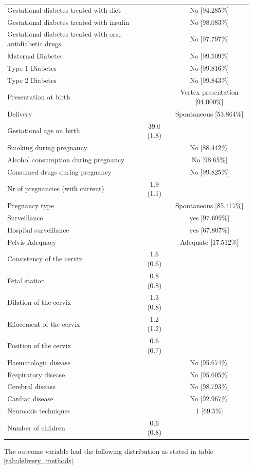 \begin{table}[htbp]
\begin{tabular}{m{15em}cc}
        Gestational diabetes treated with diet & ~ & No [94.285\%] \\ 
        Gestational diabetes treated with insulin & ~ & No [98.083\%] \\ 
        Gestational diabetes treated with oral antidiabetic drugs & ~ & No [97.797\%] \\ 
        Maternal Diabetes & ~ & No [99.509\%] \\ 
        Type 1 Diabetes & ~ & No [99.816\%] \\ 
        Type 2 Diabetes & ~ & No [99.843\%] \\ 
        Presentation at birth & ~ & Vertex presentation [94.000\%] \\ 
        Delivery & ~ & Spontaneous [53.864\%] \\ 
        Gestational age on birth & 39.0 (1.8) & ~ \\ 
        Smoking during pregnancy & ~ & No [88.442\%] \\ 
        Alcohol consumption during pregnancy & ~ & No [98.65\%] \\ 
        Consumed drugs during pregnancy & ~ & No [99.825\%] \\ 
        Nr of pregnancies (with current) & 1.9 (1.1) & ~ \\ 
        Pregnancy type & ~ & Spontaneous [85.417\%] \\ 
        Surveillance & ~ & yes [97.699\%] \\ 
        Hospital surveillance & ~ & yes [67.807\%] \\ 
        Pelvis Adequacy & ~ & Adequate [17.512\%] \\ 
        Consistency of the cervix & 1.6 (0.6) & ~ \\ 
        Fetal station & 0.8 (0.8) & ~ \\ 
        Dilation of the cervix & 1.3 (0.8) & ~ \\ 
        Effacement of the cervix & 1.2 (1.2) & ~ \\ 
        Position of the cervix & 0.6 (0.7) & ~ \\ 
        Haematologic disease & ~ & No [95.674\%] \\ 
        Respiratory disease & ~ & No [95.605\%] \\ 
        Cerebral disease & ~ & No [98.793\%] \\ 
        Cardiac disease & ~ & No [92.967\%] \\ 
        Neuroaxis techniques & ~ & 1 [69.5\%] \\ 
        Number of children  & 0.6 (0.8)  & ~\\ 
        \bottomrule
    \end{tabular}


\end{table}
The outcome variable had the following distribution as stated in table \ref{tab:delivery_methods}.

